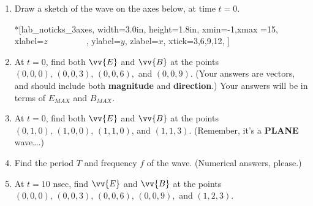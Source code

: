 \begin{enumerate}[labparts]
\item Draw a sketch of the wave on the axes below, at time $t=0$.

\begin{lab_axis}*[lab_noticks_3axes,
	width={3.0in}, height={1.8in},
	xmin=-1,xmax =15,
	xlabel={$z$~~~~~~~~~},  %
	ylabel=$y$,
	zlabel=$x$,
	xtick={3,6,9,12},
	]
\end{lab_axis}
\answerspace{0.1in}

\item At $t=0$, find both $\vv {E}$ and $\vv {B}$ at the points $(0,0,0), \,(0,0,3), \,(0,0,6),$ and $(0,0,9)$.  (Your answers are vectors, and should include both \textbf{magnitude} and \textbf{direction}.)  Your answers will be in terms of
$E_{MAX}$ and $B_{MAX}$.
\vspace{1.0in}

\item At $t=0$, find both $\vv {E}$ and $\vv {B}$ at the points $(0,1,0), \,(1,0,0), \,(1,1,0)$, and $(1,1,3)$.  (Remember, it's a \textbf{PLANE} wave….)
\vspace{1.0in}

\item Find the period $T$ and frequency $f$ of the wave.  (Numerical answers, please.)
\vspace{1.0in}

\item At $t=10$ nsec, find $\vv {E}$ and $\vv {B}$ at the points $(0,0,0), \,(0,0,3), \,(0,0,6), \,(0,0,9),$ and $(1,2,3)$.  
\vspace{1.0in}
\end{enumerate}


